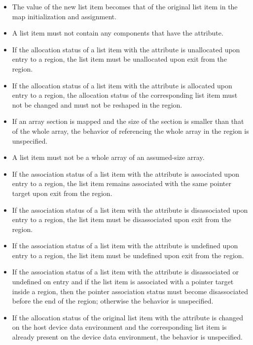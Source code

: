 \begin{fortranspecific}
\begin{itemize}
\item The value of the new list item becomes that of the original list item in the map
initialization and assignment.

\item A list item must not contain any components that have the
   attribute.

\item If the allocation status of a list item with the
   attribute is unallocated upon entry to a
   region, the list item must be unallocated
  upon exit from the region.

\item If the allocation status of a list item with the
   attribute is allocated upon entry to a
   region, the allocation status of the corresponding
  list item must not be changed and must not be reshaped in the
  region.

\item If an array section is mapped and the size of the section is
  smaller than that of the whole array, the behavior of referencing
  the whole array in the  region is unspecified.

\item A list item must not be a whole array of an assumed-size array.

\item If the association status of a list item with the 
  attribute is associated upon entry to a  region, the
  list item remains associated with the same pointer target upon exit
  from the region.

\item If the association status of a list item with the 
  attribute is disassociated upon entry to a  region, the
  list item must be disassociated upon exit from the region.

\item If the association status of a list item with the 
  attribute is undefined upon entry to a  region, the
  list item must be undefined upon exit from the region.

\item If the association status of a list item with the 
  attribute is disassociated or undefined on entry and if the list
  item is associated with a pointer target inside a 
  region, then the pointer association status must become
  disassociated before the end of the region; otherwise the behavior
  is unspecified.

\item If the allocation status of the original list item with the
   attribute is changed on the host device data
  environment and the corresponding list item is already present on
  the device data environment, the behavior is unspecified.

\end{itemize}
\end{fortranspecific}

